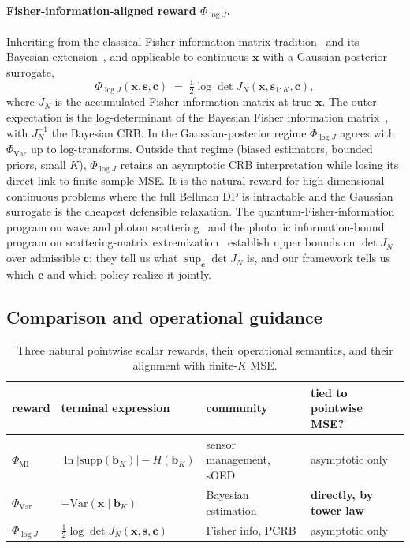 \documentclass[11pt,a4paper,onecolumn]{article}
\newcommand{\bb}{\bm{b}}
\newcommand{\bx}{\bm{x}}
\newcommand{\bc}{\bm{c}}
\newcommand{\bs}{\bm{s}}
\begin{document}
\paragraph{Fisher-information-aligned reward $\Phi_{\log J}$.}  Inheriting from the classical Fisher-information-matrix tradition~\cite{cramer1946mathematical, rao1945information, berger1985statistical} and its Bayesian extension~\cite{vantrees2007bayesian, tichavsky1998posterior}, and applicable to continuous $\bx$ with a Gaussian-posterior surrogate,
\begin{equation}
  \Phi_{\log J}(\bx, \bs, \bc) \;=\; \tfrac{1}{2} \log\det J_N(\bx, \bs_{1:K}, \bc),
\end{equation}
where $J_N$ is the accumulated Fisher information matrix at true $\bx$.  The outer expectation is the log-determinant of the Bayesian Fisher information matrix~\cite{pilanci2015randomized, chaloner1995bayesian}, with $J_N^{-1}$ the Bayesian CRB.  In the Gaussian-posterior regime $\Phi_{\log J}$ agrees with $\Phi_{\text{Var}}$ up to log-transforms.  Outside that regime (biased estimators, bounded priors, small $K$), $\Phi_{\log J}$ retains an asymptotic CRB interpretation while losing its direct link to finite-sample MSE.  It is the natural reward for high-dimensional continuous problems where the full Bellman DP is intractable and the Gaussian surrogate is the cheapest defensible relaxation.  The quantum-Fisher-information program on wave and photon scattering~\cite{bouchet2021maximum, tsang2016quantum, rotter2017light, carrington2020fisher} and the photonic information-bound program on scattering-matrix extremization~\cite{miller2016fundamental, miller2023bounds, chao2022maximum, molesky2020tmatrix, molesky2020hierarchical} establish upper bounds on $\det J_N$ over admissible $\bc$; they tell us what $\sup_{\bc} \det J_N$ is, and our framework tells us which $\bc$ and which policy realize it jointly.

\subsection{Comparison and operational guidance}
\label{sec:phi_compare}

\begin{table}[h]
\centering
\caption{Three natural pointwise scalar rewards, their operational semantics, and their alignment with finite-$K$ MSE.}
\label{tab:phi_family}
\begin{tabular}{@{}llll@{}}
\toprule
reward & terminal expression & community & tied to pointwise MSE? \\
\midrule
$\Phi_{\text{MI}}$  & $\ln|\mathrm{supp}(\bb_K)| - H(\bb_K)$            & sensor management, sOED & asymptotic only \\
$\Phi_{\text{Var}}$ & $-\mathrm{Var}(\bx \mid \bb_K)$                   & Bayesian estimation     & \textbf{directly, by tower law} \\
$\Phi_{\log J}$     & $\tfrac{1}{2}\log\det J_N(\bx, \bs, \bc)$         & Fisher info, PCRB       & asymptotic only \\
\bottomrule
\end{tabular}
\end{table}
\end{document}

